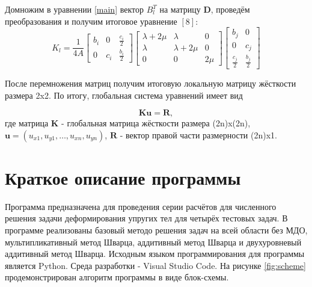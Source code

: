\documentclass[a4paper, 14pt]{extarticle}
\begin{document}
Домножим в уравнении \ref{main} вектор $B_l^T$ на матрицу $\mathbf{D}$, проведём преобразования и получим итоговое уравнение $\left[8\right]$:
\begin{equation}
K_l = \frac{1}{4A}
\begin{bmatrix}
b_i & 0 & \frac{c_i}{2}\\ 
0 & c_i & \frac{b_i}{2}
\end{bmatrix}
\begin{bmatrix}
\lambda + 2\mu & \lambda & 0 \\ 
\lambda & \lambda + 2\mu & 0 \\ 
0 & 0 & 2\mu 
\end{bmatrix}
\begin{bmatrix}
b_j & 0 \\
0 & c_j \\
\frac{c_j}{2} & \frac{b_j}{2}
\end{bmatrix}
\end{equation}

\newpage

После перемножения матриц получим итоговую локальную матрицу жёсткости размера 2x2. По итогу, глобальная система уравнений имеет вид

\begin{equation}
\mathbf{Ku} = \mathbf{R},
\end{equation}
где матрица $\mathbf{K}$ - глобальная матрица жёсткости размера (2n)x(2n), $\mathbf{u} = (u_{x1}, u_{y1}, \ldots, u_{xn}, u_{yn})$, $\mathbf{R}$ - вектор правой части размерности (2n)x1.
\newpage

\section{Краткое описание программы}

Программа предназначена для проведения серии расчётов для численного решения задачи деформирования упругих тел для четырёх тестовых задач. В программе реализованы базовый методо решения задач на всей области без МДО, мультипликативный метод Шварца, аддитивный метод Шварца и двухуровневый аддитивный метод Шварца. Исходным языком программирования для программы является Python. Среда разработки - Visual Studio Code. На рисунке \ref{fig:scheme} продемонстрирован алгоритм программы в виде блок-схемы. 
\end{document}
